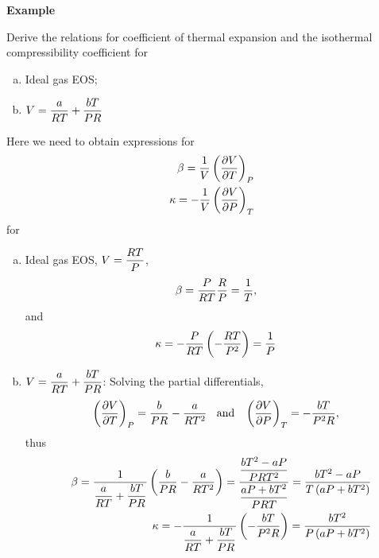    \begin{MyExample}{\begin{center}{\bf Example}\end{center}}
     \begin{example}\label{Chapter:VolumetricPropertiesPureSubstances:Example1}
         Derive the relations for coefficient of thermal expansion and the isothermal compressibility coefficient for
              \begin{enumerate}[(a)]
                  \item Ideal gas EOS;
                  \item $V=\displaystyle\frac{a}{RT}+\displaystyle\frac{bT}{PR}$ 
              \end{enumerate}
     \end{example}

         Here we need to obtain expressions for 
           \begin{eqnarray}
                && \beta = \displaystyle\frac{1}{V}\left(\displaystyle\frac{\partial V}{\partial T}\right)_{P} \nonumber \\
                && \kappa = -\displaystyle\frac{1}{V}\left(\displaystyle\frac{\partial V}{\partial P}\right)_{T} \nonumber
           \end{eqnarray}
           for 
           \begin{enumerate}[a)]
%
               \item Ideal gas EOS, $V=\displaystyle\frac{R T}{P}$,
                    \begin{displaymath}
                       \beta =\displaystyle\frac{P}{R T}\displaystyle\frac{R}{P} = \displaystyle\frac{1}{T},
                    \end{displaymath}
                    and 
                    \begin{displaymath}
                       \kappa = -\displaystyle\frac{P}{R T}\left(-\displaystyle\frac{R T}{P^{2}}\right) = \displaystyle\frac{1}{P}
                    \end{displaymath}
%
               \item $V=\displaystyle\frac{a}{RT}+\displaystyle\frac{bT}{PR}$: Solving the partial differentials,
                    \begin{displaymath}
                       \left(\displaystyle\frac{\partial V}{\partial T}\right)_{P} = \displaystyle\frac{b}{PR}-\displaystyle\frac{a}{RT^{2}}\;\;\text{ and }\;\; \left(\displaystyle\frac{\partial V}{\partial P}\right)_{T} = -\displaystyle\frac{bT}{P^{2}R},
                    \end{displaymath}
                    thus
                    \begin{eqnarray}
                       && \beta =\displaystyle\frac{1}{\displaystyle\frac{a}{RT}+\displaystyle\frac{bT}{PR}}\left(\displaystyle\frac{b}{PR}-\displaystyle\frac{a}{RT^{2}}\right) = \displaystyle\frac{\displaystyle\frac{bT^{2}-aP}{PRT^{2}}}{\displaystyle\frac{aP+bT^{2}}{PRT}} = \displaystyle\frac{bT^{2}-aP}{T\left(aP+bT^{2}\right)}
 \nonumber \\
                       && \kappa = -\displaystyle\frac{1}{\displaystyle\frac{a}{RT}+\displaystyle\frac{bT}{PR}} \left(-\displaystyle\frac{bT}{P^{2}R}\right) = \displaystyle\frac{bT^{2}}{P\left(aP+bT^{2}\right)} \nonumber
                    \end{eqnarray}           
           \end{enumerate}
   \end{MyExample}
   

